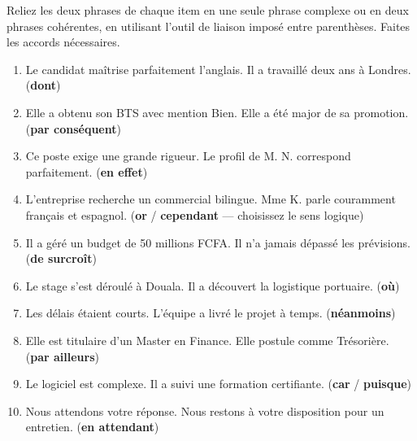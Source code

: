 \documentclass[11pt]{article}
\newcounter{popsec}
\newcounter{popsub}
\newcommand{\courssub}[1]{%
  \stepcounter{popsub}%
  \par\vspace{9pt}\noindent{\popxbold\fontsize{11.5}{13}\selectfont\color{popink}{\color{poporange}\thepopsec.\thepopsub}\hspace{6pt}#1}\par\nopagebreak\vspace{4pt}
}
\begin{document}
\begin{exercice}
Reliez les deux phrases de chaque item en une seule phrase complexe ou en deux phrases cohérentes, en utilisant l'outil de liaison imposé entre parenthèses. Faites les accords nécessaires.
\begin{enumerate}
\item Le candidat maîtrise parfaitement l'anglais. Il a travaillé deux ans à Londres. (\textbf{dont})
\item Elle a obtenu son BTS avec mention Bien. Elle a été major de sa promotion. (\textbf{par conséquent})
\item Ce poste exige une grande rigueur. Le profil de M. N. correspond parfaitement. (\textbf{en effet})
\item L'entreprise recherche un commercial bilingue. Mme K. parle couramment français et espagnol. (\textbf{or} / \textbf{cependant} — choisissez le sens logique)
\item Il a géré un budget de 50 millions FCFA. Il n'a jamais dépassé les prévisions. (\textbf{de surcroît})
\item Le stage s'est déroulé à Douala. Il a découvert la logistique portuaire. (\textbf{où})
\item Les délais étaient courts. L'équipe a livré le projet à temps. (\textbf{néanmoins})
\item Elle est titulaire d'un Master en Finance. Elle postule comme Trésorière. (\textbf{par ailleurs})
\item Le logiciel est complexe. Il a suivi une formation certifiante. (\textbf{car} / \textbf{puisque})
\item Nous attendons votre réponse. Nous restons à votre disposition pour un entretien. (\textbf{en attendant})
\end{enumerate}
\end{exercice}

\courssub{Je me prépare au Bac}
\end{document}
